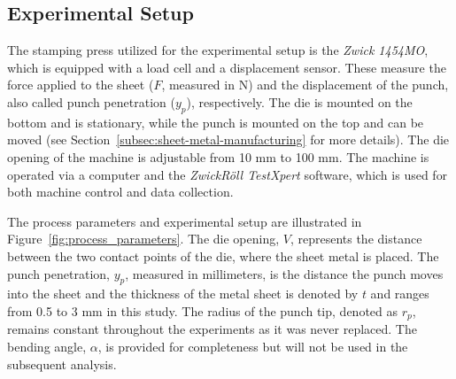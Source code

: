 %
%

\subsection{Experimental Setup}\label{subsec:experimental-setup}
The stamping press utilized for the experimental setup is the \textit{Zwick 1454MO}, which is equipped with a load cell
and a displacement sensor.
These measure the force applied to the sheet ($F$, measured in N) and the displacement of the punch, also called
punch penetration ($y_p$), respectively.
The die is mounted on the bottom and is stationary, while the punch is mounted on the top and can be moved (see
Section~\ref{subsec:sheet-metal-manufacturing} for more details).
The die opening of the machine is adjustable from 10 mm to 100 mm.
The machine is operated via a computer and the \textit{ZwickRöll TestXpert} software, which is used for both machine
control and data collection.

The process parameters and experimental setup are illustrated in Figure~\ref{fig:process_parameters}.
The die opening, $V$, represents the distance between the two contact points of the die, where the sheet metal is
placed.
The punch penetration, $y_p$, measured in millimeters, is the distance the punch moves into the sheet and
the thickness of the metal sheet is denoted by $t$ and ranges from 0.5 to 3 mm in this study.
The radius of the punch tip, denoted as $r_p$, remains constant throughout the experiments as it was never replaced.
The bending angle, $\alpha$, is provided for completeness but will not be used in the subsequent analysis.

